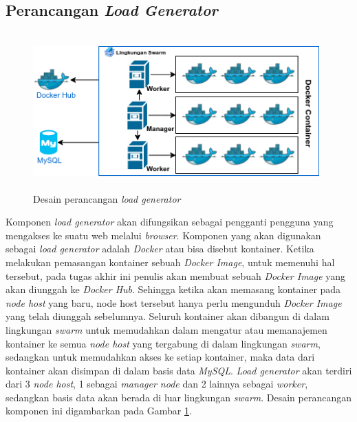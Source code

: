     	\subsection{Perancangan \textit{Load Generator}}
	    	\begin{figure}[h]
	    		\centering
	    		\includegraphics[width=11cm,height=6cm]{Images/C-3/dockerdesain.png}
	    		\caption{Desain perancangan \textit{load generator}}
	    		\label{dockerdesain}
	    	\end{figure}
    		Komponen \textit{load generator} akan difungsikan sebagai pengganti pengguna yang mengakses ke suatu web melalui \textit{browser}. Komponen yang akan digunakan sebagai \textit{load generator} adalah \textit{Docker} atau bisa disebut kontainer. Ketika melakukan pemasangan kontainer sebuah \textit{Docker Image}, untuk memenuhi hal tersebut, pada tugas akhir ini penulis akan membuat sebuah \textit{Docker Image} yang akan diunggah ke \textit{Docker Hub}. Sehingga ketika akan memasang kontainer pada \textit{node host} yang baru, node host tersebut hanya perlu mengunduh \textit{Docker Image} yang telah diunggah sebelumnya. Seluruh kontainer akan dibangun di dalam lingkungan \textit{swarm} untuk memudahkan dalam mengatur atau memanajemen kontainer ke semua \textit{node host} yang tergabung di dalam lingkungan \textit{swarm}, sedangkan untuk memudahkan akses ke setiap kontainer, maka data dari kontainer akan disimpan di dalam basis data \textit{MySQL}. \textit{Load generator} akan terdiri dari 3 \textit{node host}, 1 sebagai \textit{manager node} dan 2 lainnya sebagai \textit{worker}, sedangkan basis data akan berada di luar lingkungan \textit{swarm}. Desain perancangan komponen ini digambarkan pada Gambar \ref{dockerdesain}.
    		 
    	
